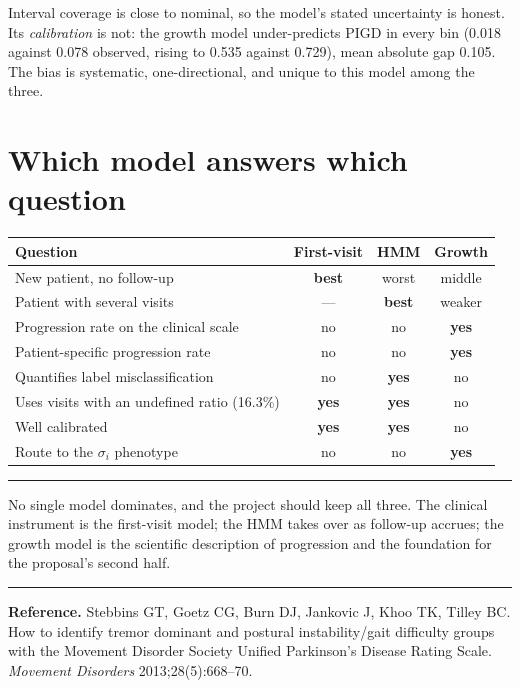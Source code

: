 \documentclass[11pt,a4paper]{article}
\newenvironment{keypoint}
  {\begin{center}\begin{minipage}{0.94\textwidth}%
   \vspace{4pt}\hrule\vspace{7pt}\small}
  {\vspace{7pt}\hrule\vspace{4pt}\end{minipage}\end{center}}
\begin{document}
\noindent
Interval coverage is close to nominal, so the model's stated uncertainty is
honest. Its \emph{calibration} is not: the growth model under-predicts PIGD in
every bin (0.018 against 0.078 observed, rising to 0.535 against 0.729), mean
absolute gap 0.105. The bias is systematic, one-directional, and unique to this
model among the three.

\section{Which model answers which question}

\begin{table}[H]
\centering
\small
\begin{tabular}{@{}p{6.6cm}ccc@{}}
\toprule
\textbf{Question} & \textbf{First-visit} & \textbf{HMM} & \textbf{Growth} \\
\midrule
New patient, no follow-up                    & \textbf{best} & worst & middle \\
Patient with several visits                  & --- & \textbf{best} & weaker \\
Progression rate on the clinical scale       & no & no & \textbf{yes} \\
Patient-specific progression rate            & no & no & \textbf{yes} \\
Quantifies label misclassification           & no & \textbf{yes} & no \\
Uses visits with an undefined ratio (16.3\%) & \textbf{yes} & \textbf{yes} & no \\
Well calibrated                              & \textbf{yes} & \textbf{yes} & no \\
Route to the $\sigma_i$ phenotype            & no & no & \textbf{yes} \\
\bottomrule
\end{tabular}
\end{table}

\begin{keypoint}
No single model dominates, and the project should keep all three. The clinical
instrument is the first-visit model; the HMM takes over as follow-up accrues;
the growth model is the scientific description of progression and the foundation
for the proposal's second half.
\end{keypoint}
\vspace{1em}
\noindent\textbf{Reference.} Stebbins GT, Goetz CG, Burn DJ, Jankovic J, Khoo TK,
Tilley BC. How to identify tremor dominant and postural instability/gait
difficulty groups with the Movement Disorder Society Unified Parkinson's Disease
Rating Scale. \emph{Movement Disorders} 2013;28(5):668--70.
\end{document}
